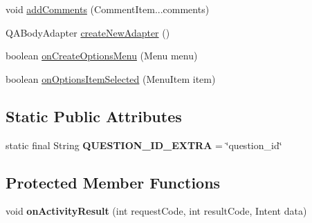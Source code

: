 \begin{DoxyCompactItemize}
\item 
void \hyperlink{classcom_1_1ualberta_1_1team17_1_1view_1_1_question_view_activity_a58926cfe234e9f52b53ad3563262f106}{add\+Comments} (Comment\+Item...\+comments)
\item 
Q\+A\+Body\+Adapter \hyperlink{classcom_1_1ualberta_1_1team17_1_1view_1_1_question_view_activity_a6730b4e34f3f87be05d9a587363f15e6}{create\+New\+Adapter} ()
\item 
boolean \hyperlink{classcom_1_1ualberta_1_1team17_1_1view_1_1_question_view_activity_ac029934f825dbeb69fb7ecf6d2638bc4}{on\+Create\+Options\+Menu} (Menu menu)
\item 
boolean \hyperlink{classcom_1_1ualberta_1_1team17_1_1view_1_1_question_view_activity_ad56a906e62a4da57e4af372cef33942a}{on\+Options\+Item\+Selected} (Menu\+Item item)
\end{DoxyCompactItemize}
\subsection*{Static Public Attributes}
\begin{DoxyCompactItemize}
\item 
\hypertarget{classcom_1_1ualberta_1_1team17_1_1view_1_1_question_view_activity_abb3161e03246eff730d43f05cb28d031}{static final String {\bfseries Q\+U\+E\+S\+T\+I\+O\+N\+\_\+\+I\+D\+\_\+\+E\+X\+T\+R\+A} = \char`\"{}question\+\_\+id\char`\"{}}\label{classcom_1_1ualberta_1_1team17_1_1view_1_1_question_view_activity_abb3161e03246eff730d43f05cb28d031}

\end{DoxyCompactItemize}
\subsection*{Protected Member Functions}
\begin{DoxyCompactItemize}
\item 
\hypertarget{classcom_1_1ualberta_1_1team17_1_1view_1_1_question_view_activity_ace57bc963fafdff9860daca9d3db119e}{void {\bfseries on\+Activity\+Result} (int request\+Code, int result\+Code, Intent data)}\label{classcom_1_1ualberta_1_1team17_1_1view_1_1_question_view_activity_ace57bc963fafdff9860daca9d3db119e}

\end{DoxyCompactItemize}
